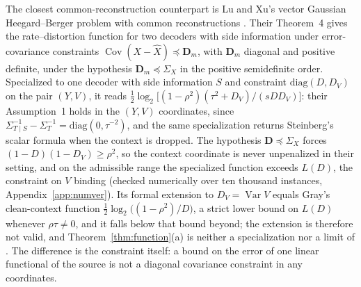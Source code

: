 \documentclass[11pt,onecolumn]{IEEEtran}
\newcommand{\Cov}{\operatorname{Cov}}
\newcommand{\hX}{\widehat{X}}
\begin{document}
The closest common-reconstruction counterpart is Lu and Xu's vector
Gaussian Heegard--Berger problem with common reconstructions
\cite{luxu2021}. Their Theorem~4 gives the rate--distortion function
for two decoders with side information under error-covariance
constraints $\Cov(X-\hX)\preceq\mathbf D_m$, with $\mathbf D_m$ diagonal
and positive definite, under the hypothesis $\mathbf D_m\preceq\Sigma_X$
in the positive semidefinite order. Specialized to one decoder with side
information $S$ and constraint $\mathrm{diag}(D,D_V)$ on the pair
$(Y,V)$, it reads
$\tfrac12\log_2\bigl[(1-\rho^2)(\tau^2+D_V)/(sDD_V)\bigr]$: their
Assumption~1 holds in the $(Y,V)$ coordinates, since
$\Sigma_{T\mid S}^{-1}-\Sigma_T^{-1}=\mathrm{diag}(0,\tau^{-2})$, and the
same specialization returns Steinberg's scalar formula when the context
is dropped. The hypothesis $\mathbf D\preceq\Sigma_X$ forces
$(1-D)(1-D_V)\ge\rho^2$, so the context coordinate is never unpenalized
in their setting, and on the admissible range the specialized function
exceeds $L(D)$, the constraint on $V$ binding (checked numerically over
ten thousand instances, Appendix~\ref{app:numver}). Its formal extension
to $D_V=\operatorname{Var}V$ equals Gray's clean-context function
$\tfrac12\log_2\bigl((1-\rho^2)/D\bigr)$, a strict lower bound on $L(D)$
whenever $\rho\tau\ne0$, and it falls below that bound beyond; the
extension is therefore not valid, and Theorem~\ref{thm:function}(a) is
neither a specialization nor a limit of \cite{luxu2021}. The
difference is the constraint itself: a bound on the error of one linear
functional of the source is not a diagonal covariance constraint in any
coordinates.
\end{document}
